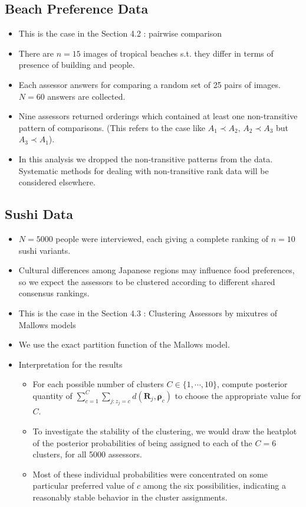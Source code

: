 \documentclass[12pt]{article}
\begin{document}
\subsection{Beach Preference Data}
\begin{itemize}
    \item This is the case in the Section 4.2 : pairwise comparison
    \item There are $n=15$ images of tropical beaches s.t. they differ in terms of presence of building and people. 
    \item Each assessor answers for comparing a random set of 25 pairs of images. $N=60$ answers are collected. 
    \item Nine assessors returned orderings which contained at least one non-transitive pattern of comparisons. (This refers to the case like $A_1\prec A_2, \, A_2\prec A_3$ but $A_3\prec A_1$).
    \item In this analysis we dropped the non-transitive patterns from the data. Systematic methods for dealing with non-transitive rank data will be considered elsewhere. 
\end{itemize}
\subsection{Sushi Data}
\begin{itemize}
    \item $N=5000$ people were interviewed, each giving a complete ranking of $n=10$ sushi variants.
    \item Cultural differences among Japanese regions may influence food preferences, so we expect the assessors to be clustered according to different shared consensus rankings. 
    \item This is the case in the Section 4.3 : Clustering Assessors by mixutres of Mallows models
    \item We use the exact partition function of the Mallows model.
    \item Interpretation for the results
    \begin{itemize}
        \item For each possible number of clusters $C\in \{1,\cdots, 10\}$, compute posterior quantity of $\sum_{c=1}^C\sum_{j:z_j=c}d(\mathbf{R}_j, \boldsymbol{\rho}_c)$ to choose the appropriate value for $C$. 
        \item To investigate the stability of the clustering, we would draw the heatplot of the posterior probabilities of being assigned to each of the $C=6$ clusters, for all 5000 assessors.
        \item Most of these individual probabilities were concentrated on some particular preferred value of $c$ among the six possibilities, indicating a reasonably stable behavior in the cluster assignments.
    \end{itemize}
\end{itemize}
\end{document}

